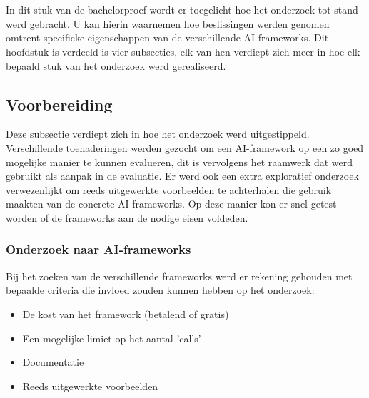 
\chapter{}
\label{ch:methodologie}


In dit stuk van de bachelorproef wordt er toegelicht hoe het onderzoek tot stand werd gebracht. U kan hierin waarnemen hoe beslissingen werden genomen omtrent specifieke eigenschappen van de verschillende AI-frameworks. Dit hoofdstuk is verdeeld is vier subsecties, elk van hen verdiept zich meer in hoe elk bepaald stuk van het onderzoek werd gerealiseerd.

\section{Voorbereiding}
Deze subsectie verdiept zich in hoe het onderzoek werd uitgestippeld. Verschillende toenaderingen werden gezocht om een AI-framework op een zo goed mogelijke manier te kunnen evalueren, dit is vervolgens het raamwerk dat werd gebruikt als aanpak in de evaluatie. Er werd ook een extra exploratief onderzoek verwezenlijkt om reeds uitgewerkte voorbeelden te achterhalen die gebruik maakten van de concrete AI-frameworks. Op deze manier kon er snel getest worden of de frameworks aan de nodige eisen voldeden.
\newpage

\subsection{ Onderzoek naar AI-frameworks}
Bij het zoeken van de verschillende frameworks werd er rekening gehouden met bepaalde criteria die invloed zouden kunnen hebben op het onderzoek:
\begin{itemize}
	\item De kost van het framework (betalend of gratis)
	\item Een mogelijke limiet op het aantal 'calls'
	\item Documentatie
	\item Reeds uitgewerkte voorbeelden
\end{itemize}

